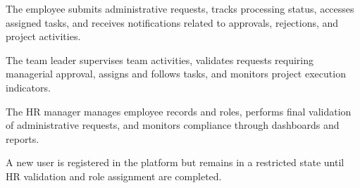 
  {\fontsize{12}{18}\selectfont
  \setlength{\parindent}{1.2cm}
  \setlength{\parskip}{6pt}

  \indent The employee submits administrative requests, tracks processing status, accesses assigned tasks, and receives notifications related to approvals, rejections, and project activities.

  }

  \vspace{6pt}


  {\fontsize{12}{18}\selectfont
  \setlength{\parindent}{1.2cm}
  \setlength{\parskip}{6pt}

  \indent The team leader supervises team activities, validates requests requiring managerial approval, assigns and follows tasks, and monitors project execution indicators.

  }

  \vspace{6pt}


  {\fontsize{12}{18}\selectfont
  \setlength{\parindent}{1.2cm}
  \setlength{\parskip}{6pt}

  \indent The HR manager manages employee records and roles, performs final validation of administrative requests, and monitors compliance through dashboards and reports.

  }

  \vspace{6pt}


  {\fontsize{12}{18}\selectfont
  \setlength{\parindent}{1.2cm}
  \setlength{\parskip}{6pt}

  \indent A new user is registered in the platform but remains in a restricted state until HR validation and role assignment are completed.

  }

  \vspace{6pt}


